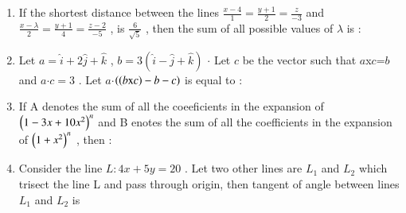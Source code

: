\documentclass[journal,12pt,onecolumn]{IEEEtran}
\theoremstyle{remark}
\begin{document}
\begin{enumerate}
\begin{enumerate}
\end{enumerate} \\
\item If the shortest distance between the lines $ \frac{x-4}{1}=\frac{y+1}{2}=\frac{z}{-3} $ and $ \frac{x-\lambda}{2}=\frac{y+1}{4}=\frac{z-2}{-5} $ , is $\frac{6}{\sqrt{5}}$ , then the sum of all possible values of $\lambda$ is : \\
\begin{enumerate}   
\end{enumerate}
\item Let $a=\hat{i}+2\hat{j}+\hat{k}$ , $b=3(\hat{i}-\hat{j}+\hat{k})$ $\cdot$ Let $c$ be the vector such that $a$x$c$=$b$ and $a$$\cdot$$c=3$ . Let $a$$\cdot$$\left(\left(b\text{x}c\right)-b-c\right)$ is equal to : \\
\begin{enumerate}   
\end{enumerate}
\item If A denotes the sum of all the coeeficients in the expansion of $\left(1-3x+10x^2\right)^{n}$ and B enotes the sum of all the coefficients in the expansion of $\left(1+x^2\right)^{n}$ , then : \\
\begin{enumerate}
\end{enumerate}
\item Consider the line $L:4x+5y=20$ . Let two other lines are $L_1$ and $L_2$ which trisect the line L and pass through origin, then tangent of angle between lines $L_1$ and $L_2$ is \\
\begin{enumerate}
\end{enumerate}
\end{enumerate}
\end{document}
